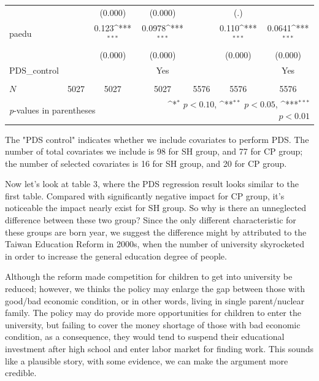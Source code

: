 \documentclass[]{AEA}
\def\sym#1{\ifmmode^{#1}\else\(^{#1}\)\fi}
\begin{document}
\begin{center}
\begin{table}
\begin{tabular}{l*{6}c}
                &                     &     (0.000)         &     (0.000)         &                     &         (.)         &                     \\
    [1em]
    paedu       &                     &       0.123\sym{***}&      0.0978\sym{***}&                     &       0.110\sym{***}&      0.0641\sym{***}\\
            &                     &     (0.000)         &     (0.000)         &                     &     (0.000)         &     (0.000)         \\
    [1em]
    PDS\_control  &   &  &  Yes    &  &    &  Yes \\
    &   &      &      &   &      &      \\
    \hline
    \(N\)       &        5027         &        5027         &        5027         &        5576         &        5576         &        5576         \\
    \bottomrule
    \multicolumn{3}{l}{\footnotesize \textit{p}-values in parentheses} & \multicolumn{4}{r}{\footnotesize \sym{*} \(p<0.10\), \sym{**} \(p<0.05\), \sym{***} \(p<0.01\)}\\
    \end{tabular}
    \begin{tablenotes}
        The "PDS control" indicates whether we include covariates to perform PDS.  The number of total covariates we include is 98 for SH group, and 77 for CP group; the number of selected covariates is 16 for SH group, and 20 for CP group.
    \end{tablenotes}
    \end{table}
    \end{center}

    Now let's look at table 3, where the PDS regression result looks similar to the first table.  Compared with significantly negative impact for CP group, it's noticeable the impact nearly exist for SH group.  So why is there an unneglected difference between these two group?  Since the only different characteristic for these groups are born year, we suggest the difference might by attributed to the Taiwan Education Reform in 2000s, when the number of university skyrocketed in order to increase the general education degree of people.  
    
    Although the reform made competition for children to get into university be reduced; however, we thinks the policy may enlarge the gap between those with good/bad economic condition, or in other words, living in single parent/nuclear family.  The policy may do provide more opportunities for children to enter the university, but failing to cover the money shortage of those with bad economic condition, as a consequence, they would tend to suspend their educational investment after high school and enter labor market for finding work.  This sounds like a plausible story, with some evidence, we can make the argument more credible.
\end{document}
